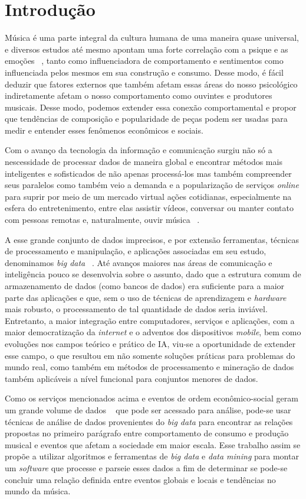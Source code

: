 \chapter{Introdução}
\label{c.introducao}

Música é uma parte integral da cultura humana de uma maneira quase universal, e diversos estudos até mesmo apontam uma forte correlação com a psique e as emoções ~\cite{krumhansl02}, tanto como influenciadora de comportamento e sentimentos como influenciada pelos mesmos em sua construção e consumo. Desse modo, é fácil deduzir que fatores externos que também afetam essas áreas do nosso psicológico indiretamente afetam o nosso comportamento como ouvintes e produtores musicais. Desse modo, podemos extender essa conexão comportamental e propor que tendências de composição e popularidade de peças podem ser usadas para medir e entender esses fenômenos econômicos e sociais.

Com o avanço da tecnologia da informação e comunicação surgiu não só a nescessidade de processar dados de maneira global e encontrar métodos mais inteligentes e sofisticados de não apenas processá-los mas também compreender seus paralelos como também veio a demanda e a popularização de serviços \textit{online} para suprir por meio de um mercado virtual ações cotidianas, especialmente na esfera do entretenimento, entre elas assistir vídeos, conversar ou manter contato com pessoas remotas e, naturalmente, ouvir música ~\cite{aljanaki15}.

A esse grande conjunto de dados imprecisos, e por extensão ferramentas, técnicas de processamento e manipulação, e aplicações associadas em seu estudo, denominamos \textit{big data} ~\cite{singh15}. Até avanços maiores nas áreas de comunicação e inteligência pouco se desenvolvia sobre o assunto, dado que a estrutura comum de armazenamento de dados (como bancos de dados) era suficiente para a maior parte das aplicações e que, sem o uso de técnicas de aprendizagem e \textit{hardware} mais robusto, o processamento de tal quantidade de dados seria inviável. Entretanto, a maior integração entre computadores, serviços e aplicações, com a  maior democratização da \textit{internet} e o adventos dos dispositivos \textit{mobile}, bem como evoluções nos campos teórico e prático de IA, viu-se a oportunidade de extender esse campo, o que resultou em não somente soluções práticas para problemas do mundo real, como também em métodos de processamento e mineração de dados também aplicáveis a nível funcional para conjuntos menores de dados.

Como os serviços mencionados acima e eventos de ordem econômico-social geram um grande volume de dados ~\cite{aljanaki15} que pode ser acessado para análise, pode-se usar técnicas de análise de dados provenientes do \textit{big data} para encontrar as relações propostas no primeiro parágrafo entre comportamento de consumo e produção musical e eventos que afetam a sociedade em maior escala. Esse trabalho assim se propõe a utilizar algoritmos e ferramentas de \textit{big data} e \textit{data mining} para montar um \textit{software} que processe e parseie esses dados a fim de determinar se pode-se concluir uma relação definida entre eventos globais e locais e tendências no mundo da música.

